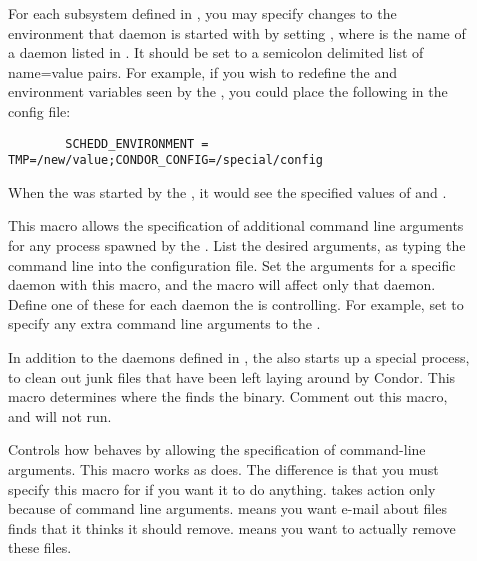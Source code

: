 \begin{description}
\item[] \label{param:DaemonNameEnvironment}
  For each subsystem defined in , you may specify
  changes to the environment that daemon is started with by setting
  , where  is the name of
  a daemon listed in . It should be set to a semicolon
  delimited list of name=value pairs. For example, if you wish to redefine the
   and  environment variables seen by the
  , you could place the following in the config file:
\begin{verbatim}
        SCHEDD_ENVIRONMENT = TMP=/new/value;CONDOR_CONFIG=/special/config
\end{verbatim}
  When the  was started by the , it would
  see the specified values of  and .

\item[] \label{param:SubsysArgs} This macro
  allows the specification of additional command line arguments for any
  process spawned by the .
  List the desired arguments, as typing the
  command line into the configuration file.  
  Set the arguments for a specific daemon with this macro,
  and the macro will affect only that daemon. Define
  one of these for each daemon the  is controlling.
  For example, set  to specify any extra
  command line arguments to the .

\item[] \label{param:Preen} In addition to the daemons
  defined in , the  also starts up
  a special process,  to clean out junk files that have
  been left laying around by Condor.  This macro determines where the
   finds the  binary.
  Comment out this macro, and  will not run.

\item[] \label{param:PreenArgs}
  Controls how  behaves by allowing the specification
  of command-line arguments.
  This macro works as  does.
  The difference is that you must specify this macro for
   if you want it to do anything.
   takes action only
  because of command line arguments.
   means you want e-mail about files  finds that it
  thinks it should remove.
   means you want  to actually remove these files.


\end{description}
